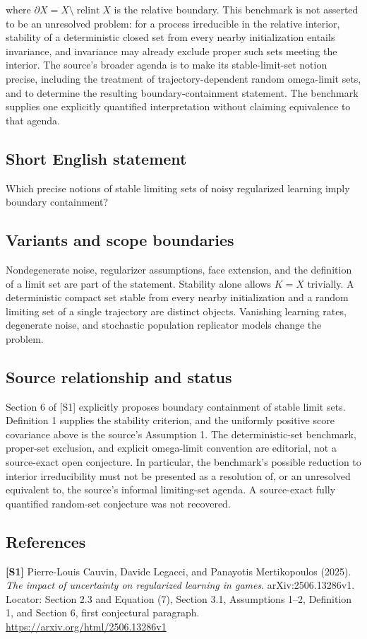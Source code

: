 \documentclass[11pt,a4paper]{article}
\begin{document}
where $\partial X=X\setminus\operatorname{relint}X$ is the relative boundary. This benchmark is not asserted to be an unresolved problem: for a process irreducible in the relative interior, stability of a deterministic closed set from every nearby initialization entails invariance, and invariance may already exclude proper such sets meeting the interior. The source's broader agenda is to make its stable-limit-set notion precise, including the treatment of trajectory-dependent random omega-limit sets, and to determine the resulting boundary-containment statement. The benchmark supplies one explicitly quantified interpretation without claiming equivalence to that agenda.
\subsection*{Short English statement}
Which precise notions of stable limiting sets of noisy regularized learning imply boundary containment?
\subsection*{Variants and scope boundaries}
Nondegenerate noise, regularizer assumptions, face extension, and the definition of a limit set are part of the statement. Stability alone allows $K=X$ trivially. A deterministic compact set stable from every nearby initialization and a random limiting set of a single trajectory are distinct objects. Vanishing learning rates, degenerate noise, and stochastic population replicator models change the problem.
\subsection*{Source relationship and status}
Section 6 of [S1] explicitly proposes boundary containment of stable limit sets. Definition 1 supplies the stability criterion, and the uniformly positive score covariance above is the source's Assumption 1. The deterministic-set benchmark, proper-set exclusion, and explicit omega-limit convention are editorial, not a source-exact open conjecture. In particular, the benchmark's possible reduction to interior irreducibility must not be presented as a resolution of, or an unresolved equivalent to, the source's informal limiting-set agenda. A source-exact fully quantified random-set conjecture was not recovered.
\subsection*{References}
\begingroup\footnotesize\raggedright
{\footnotesize\raggedright
\textbf{[S1]} Pierre-Louis Cauvin, Davide Legacci, and Panayotis Mertikopoulos (2025). \emph{The impact of uncertainty on regularized learning in games}. arXiv:2506.13286v1. Locator: Section 2.3 and Equation (7), Section 3.1, Assumptions 1--2, Definition 1, and Section 6, first conjectural paragraph. \url{https://arxiv.org/html/2506.13286v1}\par}
\end{document}
